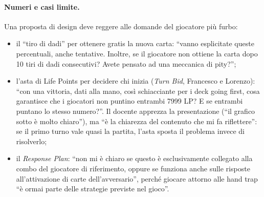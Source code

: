 \paragraph{Numeri e casi limite.} Una proposta di design deve reggere alle
domande del giocatore più furbo:
\begin{itemize}
  \item il ``tiro di dadi'' per ottenere gratis la nuova carta: ``vanno
        esplicitate queste percentuali, anche tentative. Inoltre, se il
        giocatore non ottiene la carta dopo 10 tiri di dadi consecutivi?
        Avete pensato ad una meccanica di pity?'';
  \item l'asta di Life Points per decidere chi inizia (\emph{Turn Bid},
        Francesco e Lorenzo): ``con una vittoria, dati alla mano, così
        schiacciante per i deck going first, cosa garantisce che i giocatori
        non puntino entrambi 7999 LP? E se entrambi puntano lo stesso
        numero?''. Il docente apprezza la presentazione (``il grafico sotto è
        molto chiaro''), ma ``è la chiarezza del contenuto che mi fa
        riflettere'': se il primo turno vale quasi la partita, l'asta
        sposta il problema invece di risolverlo;
  \item il \emph{Response Plan}: ``non mi è chiaro se questo è esclusivamente
        collegato alla combo del giocatore di riferimento, oppure se funziona
        anche sulle risposte all'attivazione di carte dell'avversario'',
        perché giocare attorno alle hand trap ``è ormai parte delle strategie
        previste nel gioco''.
\end{itemize}

